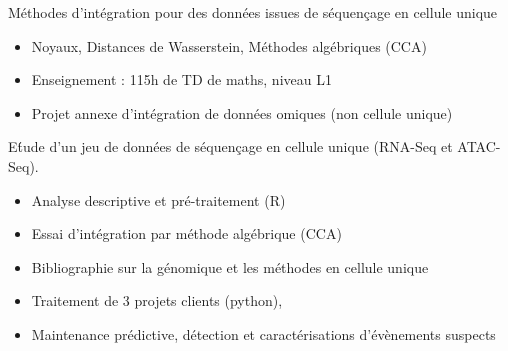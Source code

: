 \documentclass[10pt,a4paper]{altacv}
\begin{document}

 Méthodes d'intégration pour des données issues de séquençage en cellule unique
\begin{itemize}
\item Noyaux, Distances de Wasserstein, Méthodes algébriques (CCA)
\item Enseignement : 115h de TD de maths, niveau L1
\item Projet annexe d'intégration de données omiques (non cellule unique)
\end{itemize}

E\'tude d'un jeu de données de séquençage en cellule unique (RNA-Seq et ATAC-Seq). 
\begin{itemize}
\item Analyse descriptive et pré-traitement (R) 
\item Essai d'intégration par méthode algébrique (CCA) 
\item Bibliographie sur la génomique et les méthodes en cellule unique
\end{itemize}

{}

\begin{itemize}
\item Traitement de 3 projets clients (python), 
\item Maintenance prédictive, détection et caractérisations d'évènements suspects
\end{itemize}
\end{document}

